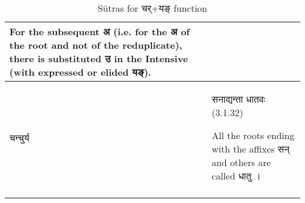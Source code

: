 \begin{longtable}{ |p{1.8cm}|p{14.2cm}| }
			For the subsequent \texthindi{अ} (i.e. for the \texthindi{अ} of the root and not of the reduplicate), there is substituted \texthindi{उ} in the Intensive (with expressed or elided \texthindi{यङ्}).
			\\\hline
			\rowcolor{yellow!10}
			\texthindi{चन्चुर्य}
			&\texthindi{सनाद्यन्ता धातवः} (3.1.32)
			
			All the roots ending with the affixes \texthindi{सन्} and others are called \texthindi{धातु} ।
			\\\hline
		
		\caption{Sūtras for \texthindi{चर्$+$यङ्} function}
		\label{table:a13}
		\end{longtable}

